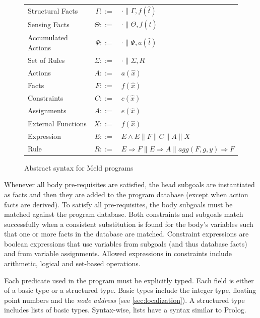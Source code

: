 \documentclass[preprint]{sigplanconf}
\begin{document}
\newcommand{\synlineend}{\\[.5ex]}
\begin{figure}
\small
\begin{tabular}{lrl}
Structural Facts & $\Gamma ::=$ & $\cdot \| \Gamma,f(\hat t)$  \synlineend

Sensing Facts & $\Theta ::=$ & $\cdot \| \Theta,f(\hat t)$ \synlineend

Accumulated Actions & $\Psi ::=$ & $\cdot \| \Psi,a(\hat t)$  \synlineend

Set of Rules & $\Sigma ::=$ & $\cdot \| \Sigma,R$ \synlineend

Actions & $A ::=$ & $a(\hat x)$ \synlineend

Facts & $F ::=$ & $f(\hat x)$ \synlineend

Constraints & $C ::=$ & $c(\hat x)$ \synlineend

Assignments & $A ::=$ & $e(\hat x)$ \synlineend

External Functions & $X ::=$ & $f(\hat x)$ \synlineend

Expression & $E ::=$ & $E \wedge E \| F \| C \| A \| X$ \synlineend

Rule
& $R ::=$ & $E \Rightarrow F \| E \Rightarrow A \| agg(F, g, y) \Rightarrow F$ \synlineend
\end{tabular}
\vspace*{-1ex}
\caption{Abstract syntax for Meld programs}
\vspace*{-2ex}
\label{fig:definitions}
\end{figure}

Whenever all body pre-requisites are satisfied, the head subgoals are instantiated as
facts and then they are added to the program database (except when action facts are derived).
To satisfy all pre-requisites, the body
subgoals must be matched against the program database. Both constraints and subgoals
match successfully when a consistent substitution is found for the body's variables such that one or
more facts in the database are matched. Constraint expressions are boolean expressions that
use variables from subgoals (and thus database facts) and from variable assignments. Allowed
expressions in constraints include arithmetic, logical and set-based operations.

Each predicate used in the program must be explicitly typed. Each field is either of a basic
type or a structured type. Basic types include the integer type, floating point numbers and
the \emph{node address} (see \ref{sec:localization}).
A structured type includes lists of basic types. Syntax-wise, lists have a syntax similar to Prolog.
\end{document}
